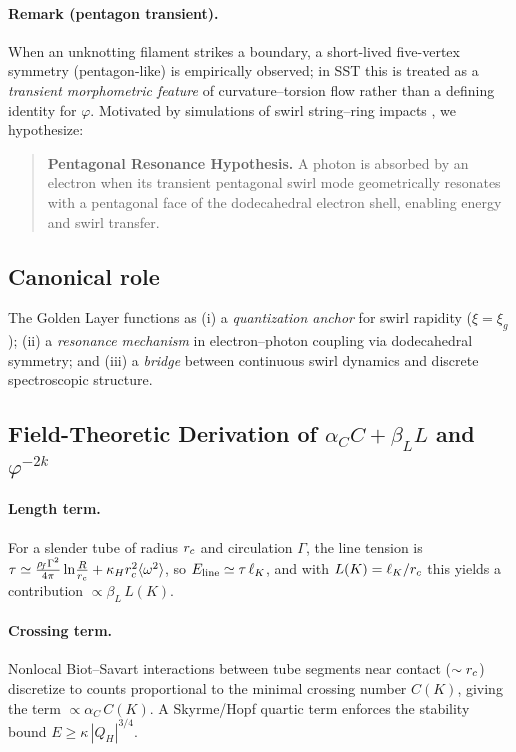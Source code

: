 \documentclass[11pt, preprint,titlepage]{revtex4-2}
\newcommand{\rhoF}{\rho_{\!f}}      %
\begin{document}
	\paragraph*{Remark (pentagon transient).}
	When an unknotting filament strikes a boundary, a short-lived five-vertex symmetry (pentagon-like) is empirically observed; in SST this is treated as a \emph{transient morphometric feature} of curvature–torsion flow rather than a defining identity for \(\varphi\). Motivated by simulations of swirl string–ring impacts \cite{orlandi1993vortex}, we hypothesize:
	\begin{quote}
		\textbf{Pentagonal Resonance Hypothesis.}
		A photon is absorbed by an electron when its transient pentagonal swirl mode geometrically resonates with a pentagonal face of the dodecahedral electron shell, enabling energy and swirl transfer.
	\end{quote}

	\subsection{Canonical role}
	The Golden Layer functions as (i) a \emph{quantization anchor} for swirl rapidity (\(\xi=\xi_g\)); (ii) a \emph{resonance mechanism} in electron–photon coupling via dodecahedral symmetry; and (iii) a \emph{bridge} between continuous swirl dynamics and discrete spectroscopic structure.

	\subsection{Field-Theoretic Derivation of \texorpdfstring{$\alpha_C C+\beta_{\!L} L$}{alpha_C C + beta_L L} and \texorpdfstring{$\varphi^{-2k}$}{phi^{-2k}}}
	\paragraph*{Length term.}
	For a slender tube of radius \(r_c\) and circulation \(\Gamma\), the line tension is
	\(
	\tau\simeq \frac{\rhoF\Gamma^2}{4\pi}\ln\!\frac{R}{\rc}+\kappa_H \rc^2\langle\omega^2\rangle
	\),
	so \(E_{\rm line}\simeq \tau\,\ell_K\),
	and with \(L(K)=\ell_K/r_c\) this yields a contribution \(\propto \beta_{\!L}\,L(K)\).

	\paragraph*{Crossing term.}
	Nonlocal Biot--Savart interactions between tube segments near contact (\(\sim r_c\)) discretize to counts proportional to the minimal crossing number \(C(K)\), giving
	the term \(\propto \alpha_C\,C(K)\). A Skyrme/Hopf quartic term enforces the stability bound \(E\ge \kappa\,|Q_H|^{3/4}\).
\end{document}
